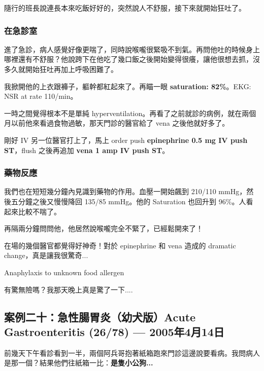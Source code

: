 \documentclass[12pt,a4paper]{article}
\newenvironment{myquote}{%
    \begin{tcolorbox}[
        colback=quote_bg,
        colframe=emergency_gray,
        boxrule=0pt,
        leftrule=3pt,
        arc=0pt,
        left=10pt,
        right=10pt,
        top=8pt,
        bottom=8pt
    ]
    \itshape
}{%
    \end{tcolorbox}
}
\begin{document}
隨行的班長說連長本來吃飯好好的，突然說人不舒服，接下來就開始狂吐了。

\subsubsection{在急診室}

進了急診，病人感覺好像更喘了，同時說喉嚨很緊吸不到氣。再問他吐的時候身上哪裡還有不舒服？他說跨下在他吃了幾口飯之後開始變得很癢，讓他很想去抓，沒多久就開始狂吐再加上呼吸困難了。

我掀開他的上衣跟褲子，軀幹都紅起來了。再瞄一眼 \textbf{saturation: 82\%}。EKG: NSR at rate 110/min。

一時之間覺得根本不是單純 hyperventilation。再看了之前就診的病例，就在兩個月以前他來看過食物過敏，那天門診的醫官給了 vena 之後他就好多了。

剛好 IV 另一位醫官打上了，馬上 order push \textbf{epinephrine 0.5 mg IV push ST}，flush 之後再追加 \textbf{vena 1 amp IV push ST}。

\subsubsection{藥物反應}

我們也在短短幾分鐘內見識到藥物的作用。血壓一開始飆到 210/110 mmHg，然後五分鐘之後又慢慢降回 135/85 mmHg。他的 Saturation 也回升到 96\%。人看起來比較不喘了。

再隔兩分鐘問問他，他居然說喉嚨完全不緊了，已經鬆開來了！

在場的幾個醫官都覺得好神奇！對於 epinephrine 和 vena 造成的 dramatic change，真是讓我很驚奇...

\begin{tcolorbox}[
    colback=emergency_blue!10!white,
    colframe=emergency_blue,
    title=\textbf{Diagnosis},
    fonttitle=\bfseries
]
Anaphylaxis to unknown food allergen
\end{tcolorbox}

\begin{myquote}
有驚無險嗎？我那天晚上真是驚了一下....
\end{myquote}

\subsection{案例二十：急性腸胃炎（幼犬版）Acute Gastroenteritis (26/78) — 2005年4月14日}

前幾天下午看診看到一半，兩個阿兵哥抱著紙箱跑來門診這邊說要看病。我問病人是那一個？結果他們往紙箱一比：\textbf{是隻小公狗...}
\end{document}
